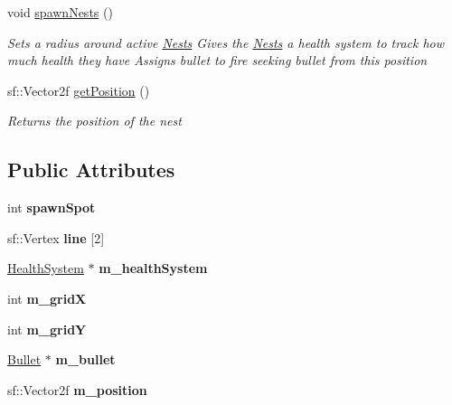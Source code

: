 \begin{DoxyCompactItemize}
void \mbox{\hyperlink{class_nests_a2d63aa3b2e3a72954f995485b173e5f1}{spawn\+Nests}} ()
\begin{DoxyCompactList}\small\item\em Sets a radius around active \mbox{\hyperlink{class_nests}{Nests}} Gives the \mbox{\hyperlink{class_nests}{Nests}} a health system to track how much health they have Assigns bullet to fire seeking bullet from this position \end{DoxyCompactList}\item 
sf\+::\+Vector2f \mbox{\hyperlink{class_nests_a3869bcee468b9ecfdb4200fcb6857c5d}{get\+Position}} ()
\begin{DoxyCompactList}\small\item\em Returns the position of the nest \end{DoxyCompactList}\end{DoxyCompactItemize}
\subsection*{Public Attributes}
\begin{DoxyCompactItemize}
\item 
\mbox{\label{class_nests_a0c635928bdc0f7ef0374fe78e34843ae}} 
int {\bfseries spawn\+Spot}
\item 
\mbox{\label{class_nests_a38ea59b54dd213b300f2b3da3b0e79ce}} 
sf\+::\+Vertex {\bfseries line} \mbox{[}2\mbox{]}
\item 
\mbox{\label{class_nests_a9dbedd161d8ee39de58a662110635661}} 
\mbox{\hyperlink{class_health_system}{Health\+System}} $\ast$ {\bfseries m\+\_\+health\+System}
\item 
\mbox{\label{class_nests_a3aadebbd4c949b83557e020b9f608f5e}} 
int {\bfseries m\+\_\+gridX}
\item 
\mbox{\label{class_nests_ad9528611a051cd31d323ebd6fc4908f9}} 
int {\bfseries m\+\_\+gridY}
\item 
\mbox{\label{class_nests_aff13627e988c12e514fa45c2c9517a94}} 
\mbox{\hyperlink{class_bullet}{Bullet}} $\ast$ {\bfseries m\+\_\+bullet}
\item 
\mbox{\label{class_nests_af75b4a367391b43c4748745ce85195a3}} 
sf\+::\+Vector2f {\bfseries m\+\_\+position}
\end{DoxyCompactItemize}
